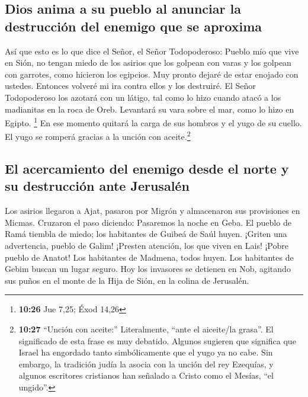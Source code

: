 \hypertarget{dios-anima-a-su-pueblo-al-anunciar-la-destrucciuxf3n-del-enemigo-que-se-aproxima}{%
\subsection{Dios anima a su pueblo al anunciar la destrucción del
enemigo que se
aproxima}\label{dios-anima-a-su-pueblo-al-anunciar-la-destrucciuxf3n-del-enemigo-que-se-aproxima}}

 Así que esto es lo que dice el Señor, el Señor
Todopoderoso: Pueblo mío que vive en Sión, no tengan miedo de los
asirios que los golpean con varas y los golpean con garrotes, como
hicieron los egipcios.  Muy pronto dejaré de estar
enojado con ustedes. Entonces volveré mi ira contra ellos y los
destruiré.  El Señor Todopoderoso los azotará con un
látigo, tal como lo hizo cuando atacó a los madianitas en la roca de
Oreb. Levantará su vara sobre el mar, como lo hizo en Egipto.
\footnote{\textbf{10:26} Jue 7,25; Éxod 14,26}  En ese
momento quitará la carga de sus hombros y el yugo de su cuello. El yugo
se romperá gracias a la unción con aceite.\footnote{\textbf{10:27}
  ``Unción con aceite:'' Literalmente, ``ante el aiceite/la grasa''. El
  significado de esta frase es muy debatido. Algunos sugieren que
  significa que Israel ha engordado tanto simbólicamente que el yugo ya
  no cabe. Sin embargo, la tradición judía la asocia con la unción del
  rey Ezequías, y algunos escritores cristianos han señalado a Cristo
  como el Mesías, ``el ungido''.}

\hypertarget{el-acercamiento-del-enemigo-desde-el-norte-y-su-destrucciuxf3n-ante-jerusaluxe9n}{%
\subsection{El acercamiento del enemigo desde el norte y su destrucción
ante
Jerusalén}\label{el-acercamiento-del-enemigo-desde-el-norte-y-su-destrucciuxf3n-ante-jerusaluxe9n}}

 Los asirios llegaron a Ajat, pasaron por Migrón y
almacenaron sus provisiones en Micmas.  Cruzaron el paso
diciendo: Pasaremos la noche en Geba. El pueblo de Ramá tiembla de
miedo; los habitantes de Guibeá de Saúl huyen.  ¡Griten
una advertencia, pueblo de Galim! ¡Presten atención, los que viven en
Lais! ¡Pobre pueblo de Anatot!  Los habitantes de
Madmena, todos huyen. Los habitantes de Gebim buscan un lugar seguro.
 Hoy los invasores se detienen en Nob, agitando sus puños
en el monte de la Hija de Sión, en la colina de Jerusalén.

